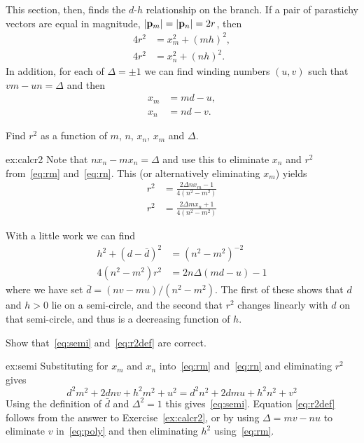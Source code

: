 This section, then, finds the $d$-$h$ relationship on the   branch.
If a pair of parastichy vectors are  equal in magnitude, $\left|{\mathbf p}_{m}\right|=\left|{\mathbf p}_{n}\right|=2r$, then 
\begin{align}
 	\label{eq:rm}
4 r^2&=x_m^2 + (mh)^2,\\
\label{eq:rn}
4 r^2&= x_n^2 + (nh)^2.
\end{align}
In addition, for each of $\Delta=\pm1$ we can find winding numbers $(u,v)$ such that $vm-un=\Delta$ 
and then
 \begin{align}
  x_m&=md-u,\\ 
  x_n&=nd-v. 
  \end{align}
\begin{jExercise}\label{ex:calcr2}
	Find $r^2$ as a function of $m$, $n$, $x_n$, $x_m$ and $\Delta$.
\end{jExercise}
\begin{jAnswer}{ex:calcr2}{
	Note that $n x_n - m x_n=\Delta$ and use this to eliminate $x_n$ and $r^2$ from~\eqref{eq:rm} and~\eqref{eq:rn}.
	This (or alternatively eliminating $x_m$) yields
	\begin{align}
	r^2		&= \frac{2 \Delta n x_m -1}{4(n^2-m^2)} \label{ex:r2xm}
		\\
		r^2		&=  \frac{2 \Delta m x_n + 1}{4(n^2-m^2)} \label{ex:r2xn}
	\end{align}
}
\end{jAnswer}
With a little work we can find
 \begin{align}
h^2  +  (d-\bar d)^2 
 &= (n^2-m^2)^{-2} \label{eq:semi}
\\
\label{eq:r2def}
4  (n^2-m^2) r^2 &= 2  n \Delta ( m d - u)-1
\end{align}
where we have set  $\bar d= {(nv-mu)}/{(n^2-m^2)}$. The first of these shows that $d$ and $h>0$ lie on a semi-circle, and the second that $r^2$ changes linearly with $d$ on that semi-circle, and thus is a decreasing function of $h$.
\begin{jExercise}\label{ex:semi}
	Show that~\eqref{eq:semi} and~\eqref{eq:r2def} are correct.
\end{jExercise} 
\begin{jAnswer}{ex:semi}{
Substituting for $x_m$ and $x_n$ into~\eqref{eq:rm} and~\eqref{eq:rn} and eliminating $r^2$ gives
\begin{equation}
	\label{eq:poly}
d^2 m^2+2 d n v+h^2 m^2+u^2=d^2 n^2+2 d m u+h^2 n^2+v^2
\end{equation}
Using the definition of $\bar{d}$ and $\Delta^2=1$ this gives~\eqref{eq:semi}. 
Equation \eqref{eq:r2def} follows from the answer to Exercise~\ref{ex:calcr2}, or by 
 using $\Delta=mv-nu$ to eliminate $v$ in~\eqref{eq:poly} and then eliminating $h^2$ using~\eqref{eq:rm}.
}
\end{jAnswer}



